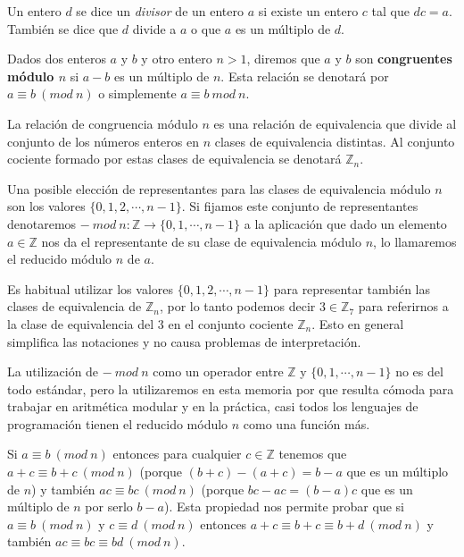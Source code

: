 \hfil

\begin{definition}
Un entero $d$ se dice un {\em divisor} de un entero $a$ si existe un entero $c$ tal
que $dc = a$. Tambi\'en se dice que $d$ divide a $a$ o que $a$ es un m\'ultiplo
de $d$.
\end{definition}

\begin{definition}
Dados dos enteros $a$ y $b$ y otro entero $n>1$, diremos que $a$ y $b$ son {\bf
congruentes m\'odulo $n$} si $a-b$ es un m\'ultiplo de $n$. Esta relaci\'on se
denotar\'a por $a \equiv b ~(mod~n)$ o simplemente $a \equiv b~mod~n$.
\end{definition}

La relaci\'on de congruencia m\'odulo $n$ es una relaci\'on de equivalencia que
divide al conjunto de los n\'umeros enteros en $n$ clases de equivalencia
distintas. Al conjunto cociente formado por estas clases de equivalencia
se denotar\'a ${\mathbb Z}_n$.

Una posible elecci\'on de representantes para las clases de
equivalencia m\'odulo $n$ son los valores $\{0,1,2,\cdots,n-1\}$.
Si fijamos este conjunto de representantes denotaremos
$- ~ mod ~ n : {\mathbb Z} \to \{0,1,\cdots,n-1\} $
a la aplicaci\'on que dado un elemento $a \in {\mathbb Z}$ nos da el representante
de su clase de equivalencia m\'odulo $n$, lo llamaremos el reducido m\'odulo $n$
de $a$.

Es habitual utilizar los valores $\{0,1,2,\cdots,n-1\}$ para representar tambi\'en
las clases de equivalencia de ${\mathbb Z}_n$, por lo tanto podemos decir $3 \in {\mathbb Z}_7$
para referirnos a la clase de equivalencia del $3$ en el conjunto cociente ${\mathbb Z}_n$.
Esto en general simplifica las notaciones y no causa problemas de interpretaci\'on.

La utilizaci\'on de $-~mod~n$ como un operador entre ${\mathbb Z}$ y $\{0,1,\cdots,n-1\}$
no es del todo est\'andar, pero la utilizaremos en esta memoria por que resulta c\'omoda
para trabajar en aritm\'etica modular y en la pr\'actica, casi todos los lenguajes de
programaci\'on tienen el reducido m\'odulo $n$ como una funci\'on m\'as.

Si $a \equiv b ~(mod~n)$ entonces para cualquier $c \in {\mathbb Z}$ tenemos que
$a + c \equiv b + c ~(mod~n)$ (porque $(b+c)-(a+c) = b-a$ que es un m\'ultiplo de $n$)
y tambi\'en $ac \equiv bc ~(mod~n)$ (porque $bc-ac=(b-a)c$ que es un m\'ultiplo de
$n$ por serlo $b-a$). Esta propiedad nos permite probar que si $a \equiv b~(mod~n)$
y $c \equiv d~(mod~n)$ entonces $a+c \equiv b+c \equiv b+d ~(mod~n)$ y tambi\'en
$ac \equiv bc \equiv bd~(mod~n)$.

